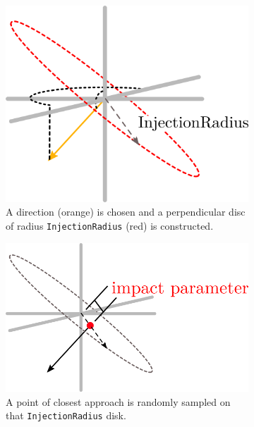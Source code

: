 \documentclass[main.tex]{subfiles}
\begin{document}
\begin{figure}
    \centering
    \begin{subfigure}[b]{0.5\linewidth}
    	\centering
        \includegraphics[width=0.8\linewidth]{figures/LI_direction_choice.png}
        \caption{A direction (orange) is chosen and a perpendicular disc of radius \texttt{InjectionRadius} (red) is constructed.}
        \label{fig:lepton_ranged1}
    \end{subfigure}%
    \begin{subfigure}[b]{0.5\linewidth}
    	\centering
        \includegraphics[width=0.8\linewidth]{figures/LI_direction_choice_pic_pt.png}
        \caption{A point of closest approach is randomly sampled on that \texttt{InjectionRadius} disk. }
        \label{fig:lepton_ranged2}
    \end{subfigure} \\
    \begin{subfigure}[b]{0.5\linewidth}
    	\centering

\end{subfigure}
\end{figure}
\end{document}
